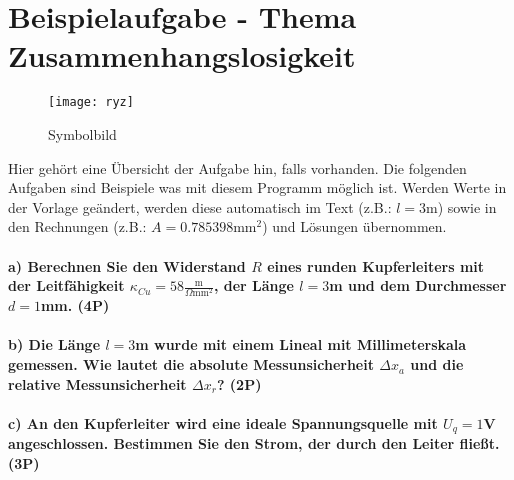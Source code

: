 \documentclass{article}
\begin{document}
\part*{Beispielaufgabe - Thema Zusammenhangslosigkeit}

\begin{wrapfigure}{r}{0.3\textwidth}
\centering
\texttt{[image: ryz]}
\caption*{Symbolbild}
\end{wrapfigure}
Hier gehört eine Übersicht der Aufgabe hin, falls vorhanden. Die folgenden Aufgaben sind Beispiele was mit diesem Programm möglich ist. Werden Werte in der Vorlage geändert, werden diese automatisch im Text (z.B.: $l= 3$m) sowie in den Rechnungen (z.B.: $A= 0.785398\text{mm}^2$) und Lösungen übernommen.\\
\subsection*{a) Berechnen Sie den Widerstand $R$ eines runden Kupferleiters mit der Leitfähigkeit $\kappa_{Cu}= 58\frac{\text{m}}{\Omega\text{mm}^2}$, der Länge $l = 3$m und dem Durchmesser $d = 1$mm. (4P)}

\vspace{15mm}\vspace{15mm}
\subsection*{b) Die Länge $l= 3$m wurde mit einem Lineal mit Millimeterskala gemessen. Wie lautet die absolute Messunsicherheit $\Delta x_a$ und die relative Messunsicherheit $\Delta x_r$? (2P)}

\vspace{15mm}\vspace{15mm}\vspace{15mm}
\subsection*{c) An den Kupferleiter wird eine ideale Spannungsquelle mit $U_q= 1$V angeschlossen. Bestimmen Sie den Strom, der durch den Leiter fließt. (3P)}

\vspace{15mm}
\end{document}

